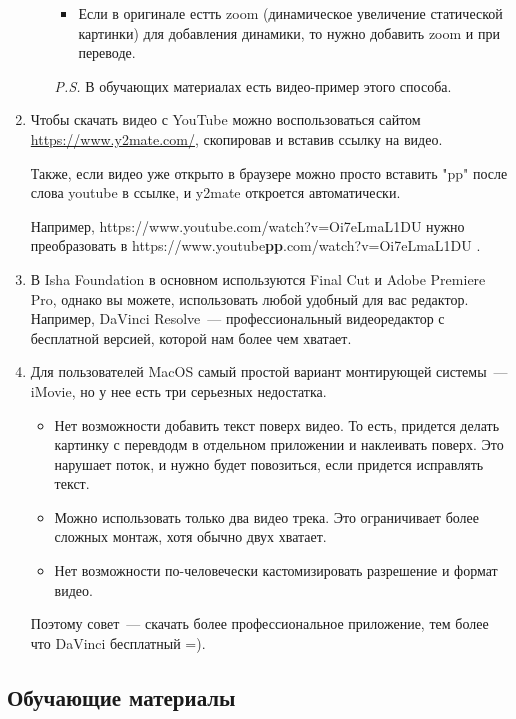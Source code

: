 \documentclass[
a4paper, %
12pt, %
article,
onecolumn, %
openany, %
]{memoir}
\begin{document}
\begin{enumerate}
\begin{itemize}
\begin{itemize}
            \item Если в оригинале естть zoom (динамическое увеличение
                статической картинки) для добавления динамики, то нужно
                добавить zoom и при переводе.

        \end{itemize}
        \textit{P.S.} В обучающих материалах есть видео-пример этого способа.
    \end{itemize}
\item Чтобы скачать видео с YouTube можно воспользоваться сайтом
    \href{https://www.y2mate.com/}{https://www.y2mate.com/}, скопировав и вставив 
    ссылку на видео. 

    Также, если видео уже открыто в браузере можно просто вставить "pp" после
    слова youtube в ссылке, и y2mate откроется автоматически.

    Например, https://www.youtube.com/watch?v=Oi7eLmaL1DU нужно преобразовать
    в https://www.youtube\textbf{pp}.com/watch?v=Oi7eLmaL1DU .
\item     {\color{gray} В Isha Foundation в основном используются Final Cut и Adobe Premiere Pro, 
    однако вы можете, использовать любой удобный для вас редактор.}
    Например, DaVinci Resolve~---
    профессиональный видеоредактор с бесплатной версией, которой нам более чем хватает. 

\item Для пользователей MacOS самый простой вариант монтирующей системы~--- 
    iMovie, но у нее есть три серьезных недостатка.
    \begin{itemize}
    \item Нет возможности добавить текст поверх видео. То есть, придется делать
        картинку с перевдодм в отдельном приложении и наклеивать поверх.
        Это нарушает поток, и нужно будет повозиться, если придется исправлять текст.
    \item Можно использовать только два видео трека. Это ограничивает более 
        сложных монтаж, хотя обычно двух хватает.
    \item Нет возможности по-человечески кастомизировать разрешение и формат видео. 
\end{itemize}
    Поэтому совет~--- скачать более профессиональное приложение, тем более что
    DaVinci бесплатный =).
\end{enumerate}





\subsection{Обучающие материалы}
\end{document}
